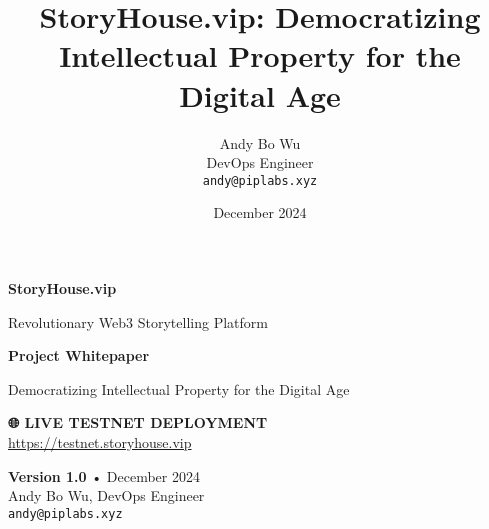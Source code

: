 \documentclass[12pt,a4paper]{article}
\title{StoryHouse.vip: Democratizing Intellectual Property for the Digital Age}
\author{Andy Bo Wu \\ DevOps Engineer \\ \texttt{andy@piplabs.xyz}}
\date{December 2024}
\begin{document}
\begin{titlepage}
    \centering
    \vspace*{2cm}
    
    \textcolor{storyblue}{\Huge \textbf{StoryHouse.vip}}
    
    \vspace{1cm}
    \textcolor{storygray}{\Large Revolutionary Web3 Storytelling Platform}
    
    \vspace{2cm}
    {\huge \textbf{Project Whitepaper}}
    
    \vspace{0.5cm}
    {\Large \textcolor{storygray}{Democratizing Intellectual Property for the Digital Age}}
    
    \vspace{2cm}
    
    \begin{center}
    \end{center}
    
    \vspace{2cm}
    
    \begin{center}
    \textcolor{storygreen}{\textbf{🌐 LIVE TESTNET DEPLOYMENT}}\\
    \textcolor{storygray}{\url{https://testnet.storyhouse.vip}}
    \end{center}
    
    \vfill
    
    \begin{center}
    \textcolor{storygray}{
        \textbf{Version 1.0} • December 2024 \\
        Andy Bo Wu, DevOps Engineer \\
        \texttt{andy@piplabs.xyz}
    }
    \end{center}
    
    \vspace{1cm}
\end{titlepage}
\end{document}
